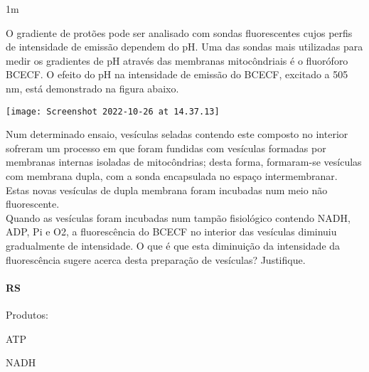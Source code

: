 \documentclass[\mainfilename]{subfiles}
\begin{document}
\begin{questionBox}1m{} %
    
    O gradiente de protões pode ser analisado com sondas fluorescentes cujos perfis de intensidade de emissão dependem do pH. Uma das sondas mais utilizadas para medir os gradientes de pH através das membranas mitocôndriais é o fluoróforo BCECF. O efeito do pH na intensidade de emissão do BCECF, excitado a 505 nm, está demonstrado na figura abaixo.

    \begin{center}
        \texttt{[image: Screenshot 2022-10-26 at 14.37.13]}
    \end{center}

    Num determinado ensaio, vesículas seladas contendo este composto no interior sofreram um processo em que foram fundidas com vesículas formadas por membranas internas isoladas de mitocôndrias; desta forma, formaram-se vesículas com membrana dupla, com a sonda encapsulada no espaço intermembranar. Estas novas vesículas de dupla membrana foram incubadas num meio não fluorescente.\\

    Quando as vesículas foram incubadas num tampão fisiológico contendo NADH, ADP, Pi e O2, a fluorescência do BCECF no interior das vesículas diminuiu gradualmente de intensidade. O que é que esta diminuição da intensidade da fluorescência sugere acerca desta preparação de vesículas? Justifique.

    \paragraph*{RS}
    Produtos:
    \begin{itemize}
        \begin{multicols}{2}
            \item ATP
            \item NADH
        \end{multicols}
    \end{itemize}
    
\end{questionBox}
\end{document}
